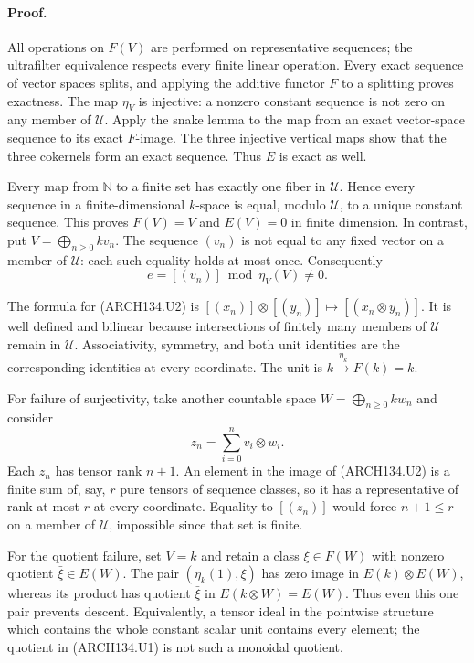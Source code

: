 \paragraph{Proof.}
All operations on $F(V)$ are performed on representative
sequences; the ultrafilter equivalence respects every finite linear
operation.  Every exact sequence of vector spaces splits, and
applying the additive functor $F$ to a splitting proves exactness.
The map $\eta_V$ is injective: a nonzero constant sequence is not
zero on any member of $\mathcal U$.  Apply the snake lemma to the
map from an exact vector-space sequence to its exact $F$-image.
The three injective vertical maps show that the three cokernels
form an exact sequence.  Thus $E$ is exact as well.

Every map from $\mathbb N$ to a finite set has exactly one fiber
in $\mathcal U$.  Hence every sequence in a finite-dimensional
$k$-space is equal, modulo $\mathcal U$, to a unique constant
sequence.  This proves $F(V)=V$ and $E(V)=0$ in finite dimension.
In contrast, put $V=\bigoplus_{n\ge0}k v_n$.  The sequence
$(v_n)$ is not equal to any fixed vector on a member of
$\mathcal U$: each such equality holds at most once.  Consequently
\[
                  e=[(v_n)]\bmod\eta_V(V)\ne0.
 \tag{ARCH134.U3}
\]

The formula for (ARCH134.U2) is
$[(x_n)]\otimes[(y_n)]\mapsto[(x_n\otimes y_n)]$.
It is well defined and bilinear because intersections of finitely
many members of $\mathcal U$ remain in $\mathcal U$.
Associativity, symmetry, and both unit identities are the
corresponding identities at every coordinate.  The unit is
$k\xrightarrow{\eta_k}F(k)=k$.

For failure of surjectivity, take another countable space
$W=\bigoplus_{n\ge0}kw_n$ and consider
\[
           z_n=\sum_{i=0}^n v_i\otimes w_i.
 \tag{ARCH134.U4}
\]
Each $z_n$ has tensor rank $n+1$.  An element in the image of
(ARCH134.U2) is a finite sum of, say, $r$ pure tensors of sequence
classes, so it has a representative of rank at most $r$ at every
coordinate.  Equality to $[(z_n)]$ would force $n+1\le r$ on a
member of $\mathcal U$, impossible since that set is finite.

For the quotient failure, set $V=k$ and retain a class
$\xi\in F(W)$ with nonzero quotient $\bar\xi\in E(W)$.
The pair $(\eta_k(1),\xi)$ has zero image in $E(k)\otimes E(W)$,
whereas its product has quotient $\bar\xi$ in
$E(k\otimes W)=E(W)$.  Thus even this one pair prevents descent.
Equivalently, a tensor ideal in the pointwise structure which
contains the whole constant scalar unit contains every element;
the quotient in (ARCH134.U1) is not such a monoidal quotient.

